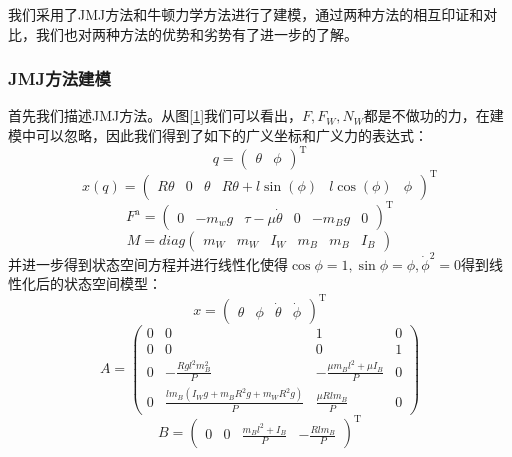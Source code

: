 \documentclass[UTF8,a4paper]{paper}
\begin{document}
我们采用了JMJ方法和牛顿力学方法进行了建模，通过两种方法的相互印证和对比，我们也对两种方法的优势和劣势有了进一步的了解。
\subsubsection{JMJ方法建模}
首先我们描述JMJ方法。从图\ref{1}我们可以看出，$F,F_W,N_W$都是不做功的力，在建模中可以忽略，因此我们得到了如下的广义坐标和广义力的表达式：
\begin{equation}
q = \begin{pmatrix} \theta & \phi \end{pmatrix}^\mathrm{T}
\end{equation}
\begin{equation}
x(q) = \begin{pmatrix}R\theta&0&\theta&R\theta+l\sin(\phi)& l\cos(\phi)& \phi \end{pmatrix}^\mathrm{T}
\end{equation}
\begin{equation}
F^\mathrm{a} = \begin{pmatrix} 0&-m_wg&\tau-\mu\dot{\theta}&0&-m_Bg&0\end{pmatrix}^\mathrm{T}
\end{equation}
\begin{equation}
M = diag\begin{pmatrix}m_W&m_W&I_W&m_B&m_B&I_B\end{pmatrix}\end{equation}
并进一步得到状态空间方程并进行线性化使得$\cos\phi=1,\sin\phi=\phi,\dot{\phi}^2=0$得到线性化后的状态空间模型：
\begin{equation}
x = \begin{pmatrix}\theta&\phi&\dot{\theta}&\dot{\phi}\end{pmatrix}^\mathrm{T}\end{equation}
\begin{equation}
A = \begin{pmatrix}
0&0&1&0\\0&0&0&1\\
0&-\frac{Rgl^2m_B^2}{P}&-\frac{\mu m_Bl^2+\mu I_B}{P}&0\\
0&\frac{lm_B(I_Wg+m_BR^2g+m_WR^2g)}{P}&\frac{\mu Rlm_B}{P}&0\end{pmatrix}\end{equation}
\begin{equation}
B = \begin{pmatrix}0&0&\frac{m_Bl^2+I_B}{P}&-\frac{Rlm_B}{P}\end{pmatrix}^\mathrm{T}\end{equation}
\end{document}
